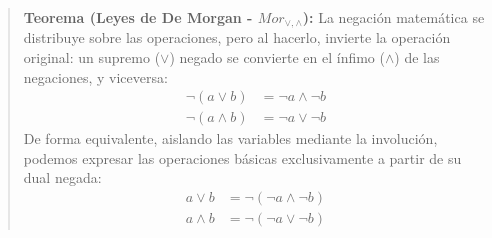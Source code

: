 \begin{quote}\textbf{Teorema (Leyes de De Morgan - $Mor_{\vee, \wedge}$):}\label{morgan}
La negación matemática se distribuye sobre las operaciones, pero al hacerlo, invierte la operación original: un supremo ($\vee$) negado se convierte en el ínfimo ($\wedge$) de las negaciones, y viceversa:
\begin{align}
    \neg (a \vee b) &= \neg a \wedge \neg b \\
    \neg (a \wedge b) &= \neg a \vee \neg b 
\end{align}
De forma equivalente, aislando las variables mediante la involución, podemos expresar las operaciones básicas exclusivamente a partir de su dual negada:
\begin{align}
    a \vee b &= \neg (\neg a \wedge \neg b) \\
    a \wedge b &= \neg (\neg a \vee \neg b) 
\end{align}
\end{quote}
